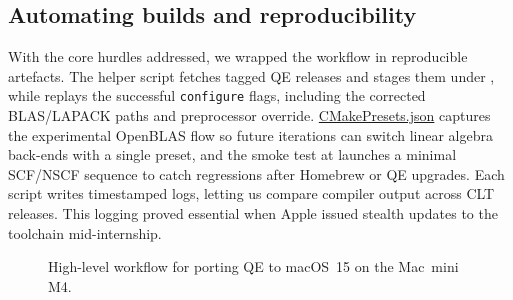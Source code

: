 \documentclass[12pt]{article}
\begin{document}
\subsection{Automating builds and reproducibility}
With the core hurdles addressed, we wrapped the workflow in reproducible artefacts. The helper script  fetches tagged QE releases and stages them under , while  replays the successful \texttt{configure} flags, including the corrected BLAS/LAPACK paths and preprocessor override. \url{CMakePresets.json} captures the experimental OpenBLAS flow so future iterations can switch linear algebra back-ends with a single preset, and the smoke test at  launches a minimal SCF/NSCF sequence to catch regressions after Homebrew or QE upgrades.
Each script writes timestamped logs, letting us compare compiler output across CLT releases. This logging proved essential when Apple issued stealth updates to the toolchain mid-internship.

\begin{figure}[H]
  \centering
  \caption{High-level workflow for porting QE to macOS~15 on the Mac~mini M4.}
  \label{fig:qe-flow}
\end{figure}
\end{document}
